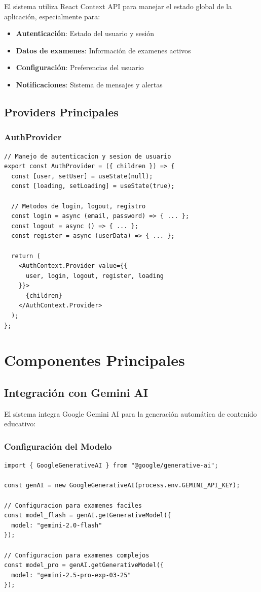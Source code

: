 \documentclass[12pt,a4paper]{report}
\begin{document}
El sistema utiliza React Context API para manejar el estado global de la aplicación, especialmente para:

\begin{itemize}
    \item \textbf{Autenticación}: Estado del usuario y sesión
    \item \textbf{Datos de examenes}: Información de examenes activos
    \item \textbf{Configuración}: Preferencias del usuario
    \item \textbf{Notificaciones}: Sistema de mensajes y alertas
\end{itemize}

\subsection{Providers Principales}

\subsubsection{AuthProvider}
\begin{lstlisting}
// Manejo de autenticacion y sesion de usuario
export const AuthProvider = ({ children }) => {
  const [user, setUser] = useState(null);
  const [loading, setLoading] = useState(true);
  
  // Metodos de login, logout, registro
  const login = async (email, password) => { ... };
  const logout = async () => { ... };
  const register = async (userData) => { ... };
  
  return (
    <AuthContext.Provider value={{
      user, login, logout, register, loading
    }}>
      {children}
    </AuthContext.Provider>
  );
};
\end{lstlisting}

\section{Componentes Principales}

\subsection{Integración con Gemini AI}

El sistema integra Google Gemini AI para la generación automática de contenido educativo:

\subsubsection{Configuración del Modelo}
\begin{lstlisting}
import { GoogleGenerativeAI } from "@google/generative-ai";

const genAI = new GoogleGenerativeAI(process.env.GEMINI_API_KEY);

// Configuracion para examenes faciles
const model_flash = genAI.getGenerativeModel({
  model: "gemini-2.0-flash"
});

// Configuracion para examenes complejos
const model_pro = genAI.getGenerativeModel({
  model: "gemini-2.5-pro-exp-03-25"
});
\end{lstlisting}
\end{document}
